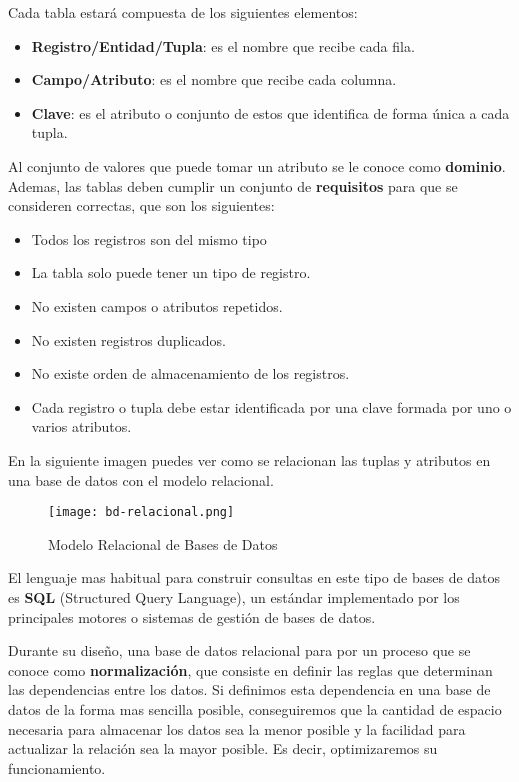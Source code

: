 Cada tabla estará compuesta de los siguientes elementos:

\begin{itemize}
    \item \textbf{Registro/Entidad/Tupla}: es el nombre que recibe cada fila.
    \item \textbf{Campo/Atributo}: es el nombre que recibe cada columna.
    \item \textbf{Clave}: es el atributo o conjunto de estos que identifica de forma única a cada tupla.
\end{itemize}

Al conjunto de valores que puede tomar un atributo se le conoce como \textbf{dominio}. Ademas, las tablas deben cumplir un conjunto de \textbf{requisitos} para que se consideren correctas, que son los siguientes:

\begin{itemize}
    \item Todos los registros son del mismo tipo
    \item La tabla solo puede tener un tipo de registro.
    \item No existen campos o atributos repetidos.
    \item No existen registros duplicados.
    \item No existe orden de almacenamiento de los registros.
    \item Cada registro o tupla debe estar identificada por una clave formada por uno o varios atributos.
\end{itemize}

En la siguiente imagen puedes ver como se relacionan las tuplas y atributos en una base de datos con el modelo relacional.

    \begin{figure}[ht]
    \centering
    \texttt{[image: bd-relacional.png]}
    \caption{Modelo Relacional de Bases de Datos}
\end{figure}

El lenguaje mas habitual para construir consultas en este tipo de bases de datos es \textbf{SQL} (Structured Query Language), un estándar implementado por los principales motores o sistemas de gestión de bases de datos.

Durante su diseño, una base de datos relacional para por un proceso que se conoce como \textbf{normalización}, que consiste en definir las reglas que determinan las dependencias entre los datos. Si definimos esta dependencia en una base de datos de la forma mas sencilla posible, conseguiremos que la cantidad de espacio necesaria para almacenar los datos sea la menor posible y la facilidad para actualizar la relación sea la mayor posible. Es decir, optimizaremos su funcionamiento.

